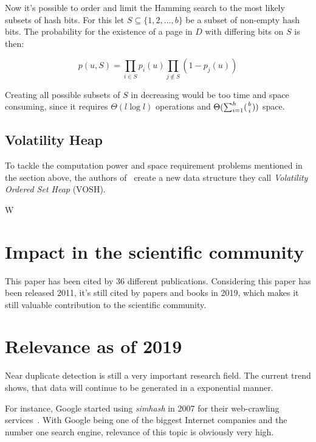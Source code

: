 \documentclass[12pt,a4paper,DIV=calc]{scrartcl}
\begin{document}
Now it's possible to order and limit the Hamming search to the most likely subsets of hash bits.
For this let $S \subseteq \{1,2,\dots, b\}$ be a subset of non-empty hash bits.
The probability for the existence of a page in $D$ with differing bits on $S$ is then:

\[p(u,S) = \prod_{i \in S}p_i(u) \prod_{j \notin S}(1-p_j(u)) \]

Creating all possible subsets of $S$ in decreasing would be too time and space consuming, since it requires $\Theta(l \log l)$ operations and $\Theta(\sum_{i=1}^{h} ({b \atop i}))$ space.

\subsection{Volatility Heap}
To tackle the computation power and space requirement problems mentioned in the section above, the authors of~\cite{inproc:main} create a new data structure they call \emph{Volatility Ordered Set Heap} (VOSH).

W


\section{Impact in the scientific community}
This paper has been cited by 36 different publications.
Considering this paper has been released 2011, it's still cited by papers and books in 2019, which makes it still valuable contribution to the scientific community.

\section{Relevance as of 2019}
Near duplicate detection is still a very important research field.
The current trend shows, that data will continue to be generated in a exponential manner.

For instance, Google started using \emph{simhash} in 2007 for their web-crawling services~\cite{Manku:2007:DNW:1242572.1242592}.
With Google being one of the biggest Internet companies and the number one search engine, relevance of this topic is obviously very high.


\printbibliography
\end{document}
